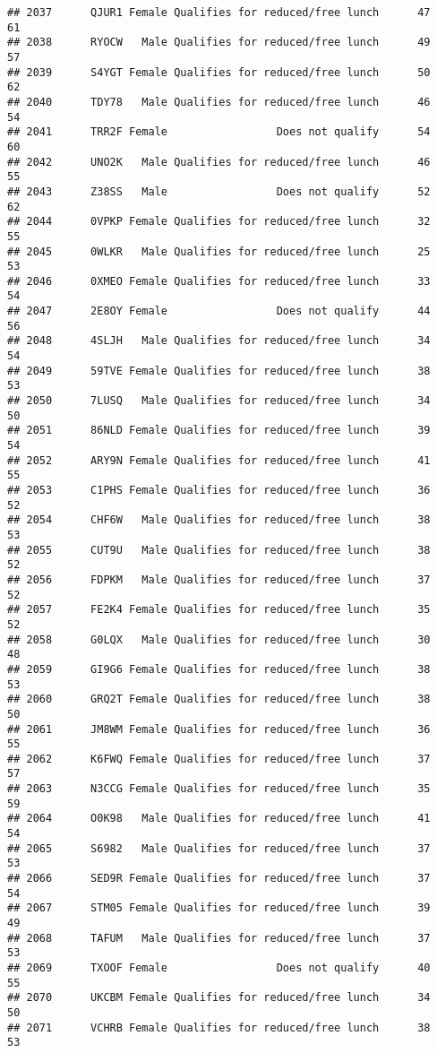 \documentclass[
]{article}
\begin{document}
\begin{verbatim}
## 2037      QJUR1 Female Qualifies for reduced/free lunch      47       61
## 2038      RYOCW   Male Qualifies for reduced/free lunch      49       57
## 2039      S4YGT Female Qualifies for reduced/free lunch      50       62
## 2040      TDY78   Male Qualifies for reduced/free lunch      46       54
## 2041      TRR2F Female                 Does not qualify      54       60
## 2042      UNO2K   Male Qualifies for reduced/free lunch      46       55
## 2043      Z38SS   Male                 Does not qualify      52       62
## 2044      0VPKP Female Qualifies for reduced/free lunch      32       55
## 2045      0WLKR   Male Qualifies for reduced/free lunch      25       53
## 2046      0XMEO Female Qualifies for reduced/free lunch      33       54
## 2047      2E8OY Female                 Does not qualify      44       56
## 2048      4SLJH   Male Qualifies for reduced/free lunch      34       54
## 2049      59TVE Female Qualifies for reduced/free lunch      38       53
## 2050      7LUSQ   Male Qualifies for reduced/free lunch      34       50
## 2051      86NLD Female Qualifies for reduced/free lunch      39       54
## 2052      ARY9N Female Qualifies for reduced/free lunch      41       55
## 2053      C1PHS Female Qualifies for reduced/free lunch      36       52
## 2054      CHF6W   Male Qualifies for reduced/free lunch      38       53
## 2055      CUT9U   Male Qualifies for reduced/free lunch      38       52
## 2056      FDPKM   Male Qualifies for reduced/free lunch      37       52
## 2057      FE2K4 Female Qualifies for reduced/free lunch      35       52
## 2058      G0LQX   Male Qualifies for reduced/free lunch      30       48
## 2059      GI9G6 Female Qualifies for reduced/free lunch      38       53
## 2060      GRQ2T Female Qualifies for reduced/free lunch      38       50
## 2061      JM8WM Female Qualifies for reduced/free lunch      36       55
## 2062      K6FWQ Female Qualifies for reduced/free lunch      37       57
## 2063      N3CCG Female Qualifies for reduced/free lunch      35       59
## 2064      O0K98   Male Qualifies for reduced/free lunch      41       54
## 2065      S6982   Male Qualifies for reduced/free lunch      37       53
## 2066      SED9R Female Qualifies for reduced/free lunch      37       54
## 2067      STM05 Female Qualifies for reduced/free lunch      39       49
## 2068      TAFUM   Male Qualifies for reduced/free lunch      37       53
## 2069      TXOOF Female                 Does not qualify      40       55
## 2070      UKCBM Female Qualifies for reduced/free lunch      34       50
## 2071      VCHRB Female Qualifies for reduced/free lunch      38       53

\end{verbatim}
\end{document}
